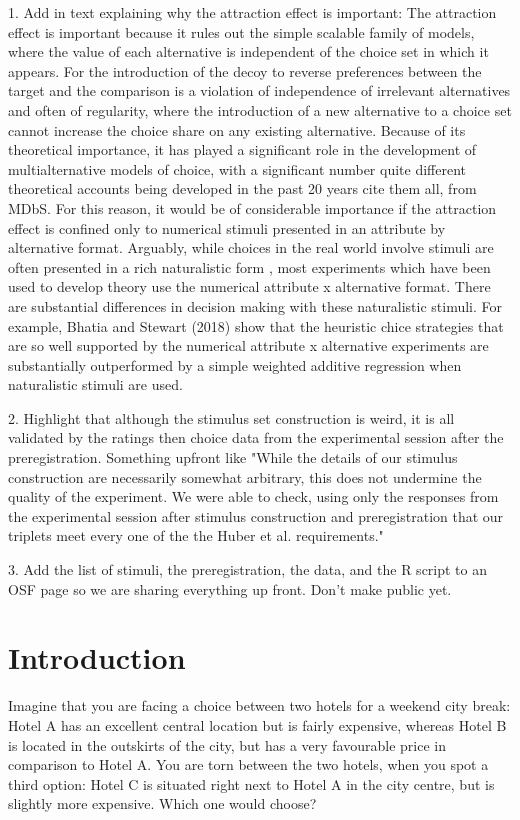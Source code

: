 \documentclass[12pt, a4paper]{article}
\begin{document}
1. Add in text explaining why the attraction effect is important: The attraction effect is important because it rules out the simple scalable family of models, where the value of each alternative is independent of the choice set in which it appears. For the introduction of the decoy to reverse preferences between the target and the comparison is a violation of independence of irrelevant alternatives and often of regularity, where the introduction of a new alternative to a choice set cannot increase the choice share on any existing alternative. Because of its theoretical importance, it has played a significant role in the development of multialternative models of choice, with a significant number quite different theoretical accounts being developed in the past 20 years {cite them all, from MDbS}. For this reason, it would be of considerable importance if the attraction effect is confined only to numerical stimuli presented in an attribute by alternative format. Arguably, while choices in the real world involve stimuli are often presented in a rich naturalistic form \cite{Bhatia2018b}, most experiments which have been used to develop theory use the numerical attribute x alternative format. There are substantial differences in decision making with these naturalistic stimuli. For example, Bhatia and Stewart (2018) show that the heuristic chice strategies that are so well supported by  the numerical attribute x alternative experiments are substantially outperformed by a simple weighted additive regression when naturalistic stimuli are used.

2. Highlight that although the stimulus set construction is weird, it is all validated by the ratings then choice data from the experimental session after the preregistration. Something upfront like "While the details of our stimulus construction are necessarily somewhat arbitrary, this does not undermine the quality of the experiment. We were able to check, using only the responses from the experimental session after stimulus construction and preregistration that our triplets meet every one of the the Huber et al. requirements."

3. Add the list of stimuli, the preregistration, the data, and the R script to an OSF page so we are sharing everything up front. Don't make public yet.

\section{Introduction}

Imagine that you are facing a choice between two hotels for a weekend city break: Hotel A has an excellent central location but is fairly expensive, whereas Hotel B is located in the outskirts of the city, but has a very favourable price in comparison to Hotel A. You are torn between the two hotels, when you spot a third option: Hotel C is situated right next to Hotel A in the city centre, but is slightly more expensive. Which one would choose?
\end{document}
